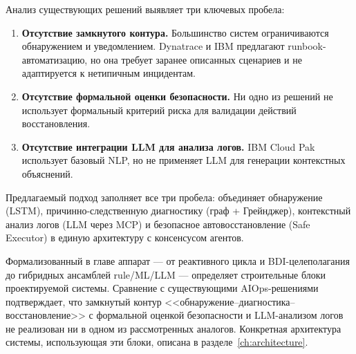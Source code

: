 Анализ существующих решений выявляет три ключевых пробела:

\begin{enumerate}
    \item \textbf{Отсутствие замкнутого контура.} Большинство систем ограничиваются обнаружением и уведомлением. Dynatrace и IBM предлагают runbook-автоматизацию, но она требует заранее описанных сценариев и не адаптируется к нетипичным инцидентам.

    \item \textbf{Отсутствие формальной оценки безопасности.} Ни одно из решений не использует формальный критерий риска для валидации действий восстановления.

    \item \textbf{Отсутствие интеграции LLM для анализа логов.} IBM Cloud Pak использует базовый NLP, но не применяет LLM для генерации контекстных объяснений.
\end{enumerate}

Предлагаемый подход заполняет все три пробела: объединяет обнаружение (LSTM), причинно-следственную диагностику (граф + Грейнджер), контекстный анализ логов (LLM через MCP) и безопасное автовосстановление (Safe Executor) в единую архитектуру с консенсусом агентов.

\medskip

Формализованный в главе аппарат --- от реактивного цикла и BDI-целеполагания до гибридных ансамблей rule/ML/LLM --- определяет строительные блоки проектируемой системы. Сравнение с существующими AIOps-решениями подтверждает, что замкнутый контур <<обнаружение--диагностика--восстановление>> с формальной оценкой безопасности и LLM-анализом логов не реализован ни в одном из рассмотренных аналогов. Конкретная архитектура системы, использующая эти блоки, описана в разделе~\ref{ch:architecture}.
